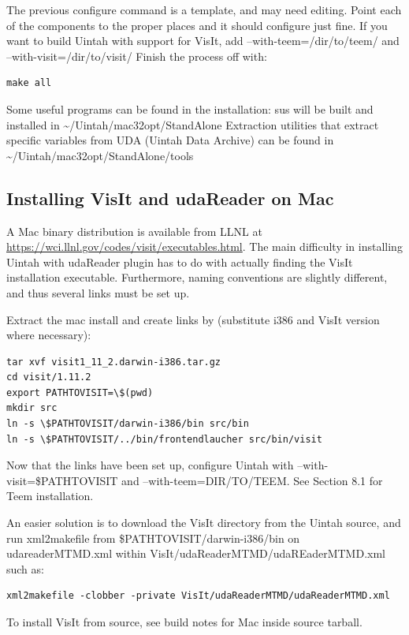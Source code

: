 \documentclass[12pt]{article}
\begin{document}
The previous configure command is a template, and may need editing.
Point each of the components to the proper places and it should
configure just fine.  If you want to build Uintah with support for
VisIt, add --with-teem=/dir/to/teem/ and --with-visit=/dir/to/visit/
Finish the process off with:

\begin{verbatim}
make all
\end{verbatim}
  

Some useful programs can be found in the installation: sus will be
built and installed in \textasciitilde/Uintah/mac32opt/StandAlone
Extraction utilities that extract specific variables from UDA (Uintah
Data Archive) can be found in
\textasciitilde/Uintah/mac32opt/StandAlone/tools

\subsection{Installing VisIt and udaReader on Mac}

A Mac binary distribution is available from LLNL at
\url{https://wci.llnl.gov/codes/visit/executables.html}.  The main
difficulty in installing Uintah with udaReader plugin has to do with
actually finding the VisIt installation executable.  Furthermore,
naming conventions are slightly different, and thus several links must
be set up.

Extract the mac install and create links by (substitute i386 and VisIt
version where necessary):

\begin{verbatim}
tar xvf visit1_11_2.darwin-i386.tar.gz
cd visit/1.11.2
export PATHTOVISIT=\$(pwd)
mkdir src
ln -s \$PATHTOVISIT/darwin-i386/bin src/bin
ln -s \$PATHTOVISIT/../bin/frontendlaucher src/bin/visit
\end{verbatim}

Now that the links have been set up, configure Uintah with
--with-visit=\$PATHTOVISIT and --with-teem=DIR/TO/TEEM.  See Section
8.1 for Teem installation.

An easier solution is to download the VisIt directory from the Uintah
source, and run xml2makefile from \$PATHTOVISIT/darwin-i386/bin on
udareaderMTMD.xml within VisIt/udaReaderMTMD/udaREaderMTMD.xml such
as:

\begin{verbatim}
xml2makefile -clobber -private VisIt/udaReaderMTMD/udaReaderMTMD.xml
\end{verbatim}

To install VisIt from source, see build notes for Mac inside source
tarball.
\end{document}
